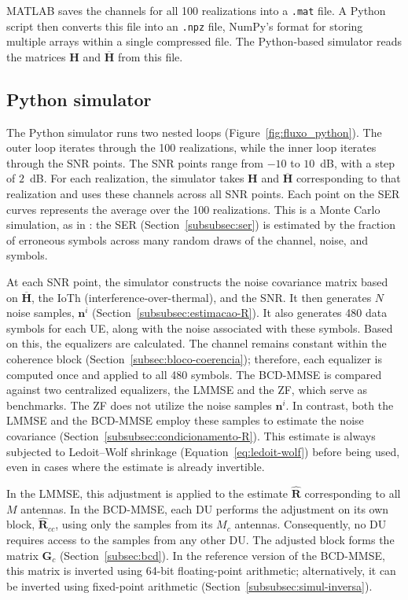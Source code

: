 MATLAB saves the channels for all 100 realizations into a \texttt{.mat} file. A Python script then converts this file into an \texttt{.npz} file, NumPy’s format for storing multiple arrays within a single compressed file. The Python-based simulator reads the matrices $\mathbf{H}$ and $\overline{\mathbf{H}}$ from this file.
\subsection{\texorpdfstring{Python simulator}{Python simulator}}\label{subsubsec:simul-python}
The Python simulator runs two nested loops (Figure~\ref{fig:fluxo_python}). The outer loop iterates through the 100 realizations, while the inner loop iterates through the SNR points. The SNR points range from $-10$ to $10$~dB, with a step of $2$~dB. For each realization, the simulator takes $\mathbf{H}$ and $\overline{\mathbf{H}}$ corresponding to that realization and uses these channels across all SNR points. Each point on the SER curves represents the average over the 100 realizations. This is a Monte Carlo simulation, as in \cite{zhuang2025}: the SER (Section~\ref{subsubsec:ser}) is estimated by the fraction of erroneous symbols across many random draws of the channel, noise, and symbols.

At each SNR point, the simulator constructs the noise covariance matrix based on $\overline{\mathbf{H}}$, the IoTh (interference-over-thermal), and the SNR. It then generates $N$ noise samples, $\mathbf{n}^i$ (Section~\ref{subsubsec:estimacao-R}). It also generates 480 data symbols for each UE, along with the noise associated with these symbols. Based on this, the equalizers are calculated. The channel remains constant within the coherence block (Section~\ref{subsec:bloco-coerencia}); therefore, each equalizer is computed once and applied to all 480 symbols. The BCD-MMSE is compared against two centralized equalizers, the LMMSE and the ZF, which serve as benchmarks. The ZF does not utilize the noise samples $\mathbf{n}^i$. In contrast, both the LMMSE and the BCD-MMSE employ these samples to estimate the noise covariance (Section~\ref{subsubsec:condicionamento-R}). This estimate is always subjected to Ledoit–Wolf shrinkage (Equation~\ref{eq:ledoit-wolf}) before being used, even in cases where the estimate is already invertible.

In the LMMSE, this adjustment is applied to the estimate $\hat{\mathbf{R}}$ corresponding to all $M$ antennas. In the BCD-MMSE, each DU performs the adjustment on its own block, $\hat{\mathbf{R}}_{cc}$, using only the samples from its $M_c$ antennas. Consequently, no DU requires access to the samples from any other DU. The adjusted block forms the matrix $\mathbf{G}_c$ (Section~\ref{subsec:bcd}). In the reference version of the BCD-MMSE, this matrix is inverted using 64-bit floating-point arithmetic; alternatively, it can be inverted using fixed-point arithmetic (Section~\ref{subsubsec:simul-inversa}).



